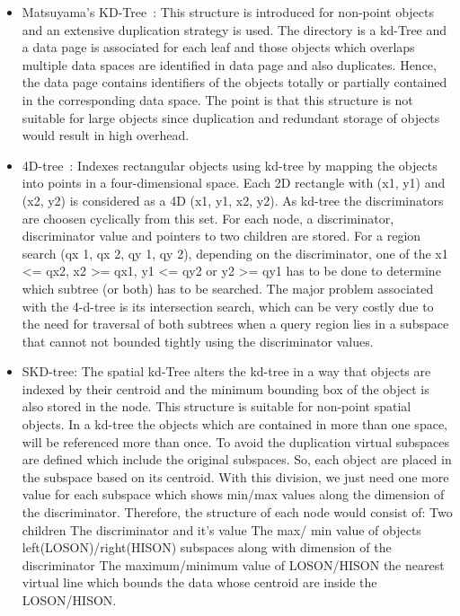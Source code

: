 \documentclass[a4paper,12pt]{article}
\begin{document}
\begin{itemize}
\item Matsuyama’s KD-Tree~\cite{matsuyama}:
This structure is introduced for non-point objects and an extensive duplication strategy is used. The directory is a kd-Tree and a data page is associated for each leaf and those objects which overlaps multiple data spaces are identified in data page and also duplicates. Hence, the data page contains identifiers of the objects totally or partially contained in the corresponding data space.
The point is that this structure is not suitable for large objects since duplication and redundant storage of objects would result in high overhead.
\item 4D-tree~\cite{4dtree}: Indexes rectangular objects using kd-tree by mapping the objects into points in a four-dimensional space. Each 2D rectangle with (x1, y1) and (x2, y2) is considered as a 4D (x1, y1, x2, y2). As kd-tree the discriminators are choosen cyclically from this set. For each node, a discriminator, discriminator value and pointers to two children are stored. 
For a region search (qx 1, qx 2, qy 1, qy 2), depending on the discriminator, one of the x1 <= qx2, x2  >=  qx1, y1 <= qy2 or y2 >= qy1 has to be done to determine which subtree (or both) has to be searched.
The major problem associated with the 4-d-tree is its intersection search, which can be very costly due to the need for traversal of both subtrees when a query region lies in a subspace that cannot not bounded tightly using the discriminator values.
\item SKD-tree: The spatial kd-Tree alters the kd-tree in a way that objects are indexed by their centroid and the minimum bounding box of the object is also stored in the node. This structure is suitable for non-point spatial objects. In a kd-tree the objects which are contained in more than one space, will be referenced more than once. To avoid the duplication virtual subspaces are defined which include the original subspaces. So, each object are placed in the subspace based on its centroid.
With this division, we just need one more value for each subspace which shows min/max values along the dimension of the discriminator. Therefore, the structure of each node would consist of:
Two children
The discriminator and it's value
The max/ min value of objects left(LOSON)/right(HISON) subspaces along with dimension of the discriminator
The maximum/minimum value of LOSON/HISON the nearest virtual line which bounds the data whose centroid are inside the LOSON/HISON.


\end{itemize}
\end{document}
